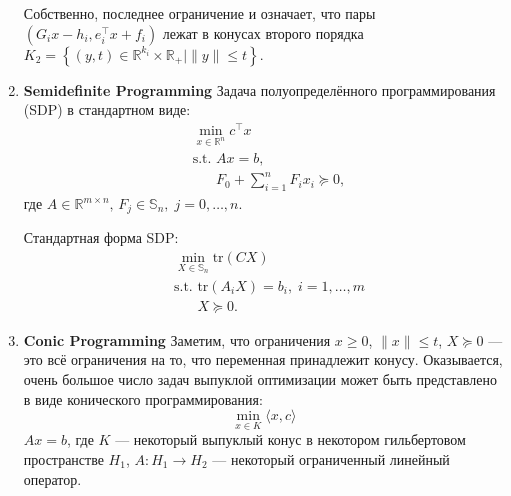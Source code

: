 \begin{enumerate}
          Собственно, последнее ограничение и означает, что пары \( (G_i x - h_i, e_i^\top x + f_i) \) лежат в конусах второго порядка \( K_2 = \left\{ (y, t) \in \mathbb{R}^{k_i} \times \mathbb{R}_+ \mid \| y \| \leq t \right\}. \)

    \item \textbf{Semidefinite Programming}
          Задача полуопределённого программирования (SDP) в стандартном виде:
          \begin{equation}
              \begin{aligned}
                   & \min_{x \in \mathbb{R}^n} c^\top x                           \\
                   & \text{s.t. } Ax = b,                                         \\
                   & \phantom{\text{s.t. }} F_0 + \sum_{i=1}^n F_i x_i \succeq 0,
              \end{aligned}
          \end{equation}
          где \( A \in \mathbb{R}^{m \times n}, \, F_j \in \mathbb{S}_n, \; j = 0, \dots, n. \)

          Стандартная форма SDP:
          \begin{equation}
              \begin{aligned}
                   & \min_{X \in \mathbb{S}_n} \text{tr}(C X)                \\
                   & \text{s.t. } \text{tr}(A_i X) = b_i, \; i = 1, \dots, m \\
                   & \phantom{\text{s.t. }} X \succeq 0.
              \end{aligned}
          \end{equation}

    \item \textbf{Conic Programming}
          Заметим, что ограничения \( x \geq 0 \), \( \| x \| \leq t \), \( X \succeq 0 \) — это всё ограничения на то, 
          что переменная принадлежит конусу. 
          Оказывается, очень большое число задач выпуклой оптимизации может быть представлено в виде 
          конического программирования:
          \begin{equation}
              \min_{x \in K} \langle x, c \rangle
          \end{equation}
           \( A x = b \),
          где \( K \) — некоторый выпуклый конус в некотором гильбертовом пространстве \( H_1 \), \( A : H_1 \to H_2 \) — некоторый ограниченный линейный оператор.
\end{enumerate}

